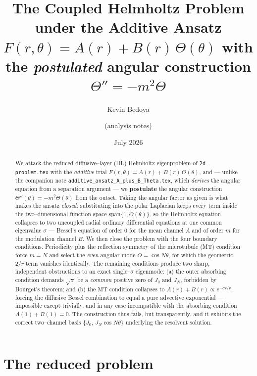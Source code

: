 \documentclass{article}
\title{The Coupled Helmholtz Problem under the Additive Ansatz\\
$F(r,\theta)=A(r)+B(r)\,\Theta(\theta)$ with the \emph{postulated} angular
construction $\Theta''=-m^{2}\Theta$}
\author{Kevin Bedoya \and (analysis notes)}
\date{July 2026}
\begin{document}
\maketitle

\begin{abstract}
We attack the reduced diffusive--layer (DL) Helmholtz eigenproblem of
\texttt{2d-problem.tex} with the \emph{additive} trial
$F(r,\theta)=A(r)+B(r)\,\Theta(\theta)$, and --- unlike the companion note
\texttt{additive\_ansatz\_A\_plus\_B\_Theta.tex}, which \emph{derives} the
angular equation from a separation argument --- we \textbf{postulate} the angular
construction $\Theta''(\theta)=-m^{2}\Theta(\theta)$ from the outset. Taking the
angular factor as given is what makes the ansatz \emph{closed}: substituting into
the polar Laplacian keeps every term inside the two--dimensional function space
$\mathrm{span}\{1,\Theta(\theta)\}$, so the Helmholtz equation collapses to two
uncoupled radial ordinary differential equations at one common eigenvalue
$\sigma$ --- Bessel's equation of order $0$ for the mean channel $A$ and of order
$m$ for the modulation channel $B$. We then close the problem with the four
boundary conditions. Periodicity plus the reflection symmetry of the microtubule
(MT) condition force $m=N$ and select the \emph{even} angular mode
$\Theta=\cos N\theta$, for which the geometric $2/r$ term vanishes identically.
The remaining conditions produce two sharp, independent obstructions to an exact
single--$\sigma$ eigenmode: (a) the outer absorbing condition demands
$\sqrt\sigma$ be a \emph{common} positive zero of $J_0$ and $J_N$, forbidden by
Bourget's theorem; and (b) the MT condition collapses to
$A(r)+B(r)\propto e^{-\sigma r/v}$, forcing the diffusive Bessel combination to
equal a pure advective exponential --- impossible except trivially, and in any
case incompatible with the absorbing condition $A(1)+B(1)=0$. The construction
thus fails, but transparently, and it exhibits the correct two--channel basis
$\{J_0,\,J_N\cos N\theta\}$ underlying the resolvent solution.
\end{abstract}

\section{The reduced problem}
\end{document}
